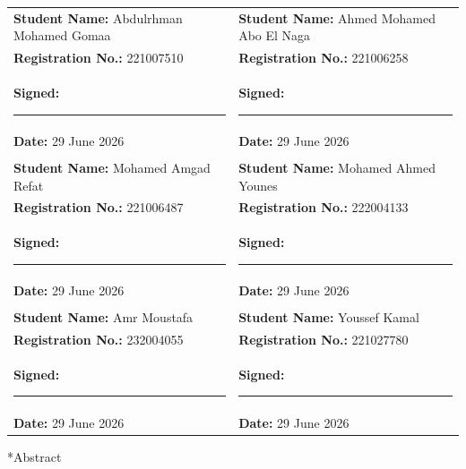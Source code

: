 \documentclass[12pt, a4paper, oneside]{report}
\makeatletter
\newcommand{\chapformat}[1]{%
  \centering
  {\fontsize{14}{17}\selectfont\itshape\addfontfeatures{LetterSpace=3.5}%
    \MakeUppercase{\chaptertitlename}\ \thechapter}\\[24pt]%
  {\fontsize{16}{19}\selectfont\bfseries\addfontfeatures{LetterSpace=0}%
    \MakeUppercase{#1}}%
}
\newcommand{\chapformatstar}[1]{%
  \centering
  {\fontsize{16}{19}\selectfont\bfseries\MakeUppercase{#1}}%
}
\newcommand{\chapterstar}[1]{%
  \clearpage
  \phantomsection
  \edef\@saved@chapcount{\the\value{chapter}}%
  \titleformat{\chapter}[block]{}{}%
    {0pt}{\chapformatstar}%
  \@originalchapter*{#1}%
  \setcounter{chapter}{\@saved@chapcount}%
  \titleformat{\chapter}[block]{}{}%
    {0pt}{\chapformat}%
}
\let\@originalchapter\chapter
\renewcommand{\chapter}{%
  \@ifstar{\chapterstar}{\@originalchapter}%
}
\newcommand{\sigline}{\rule{5cm}{0.4pt}}
\makeatother
\begin{document}
\noindent
\begin{tabular}{@{}p{} p{}@{}}

\textbf{Student Name:} Abdulrhman Mohamed Gomaa
& \textbf{Student Name:} Ahmed Mohamed Abo El Naga \\[6pt]

\textbf{Registration No.:} 221007510
& \textbf{Registration No.:} 221006258 \\[10pt]

\textbf{Signed:} \sigline
& \textbf{Signed:} \sigline \\[10pt]

\textbf{Date:} 29 June 2026
& \textbf{Date:} 29 June 2026 \\[30pt]

\\[20pt]

\textbf{Student Name:} Mohamed Amgad Refat
& \textbf{Student Name:} Mohamed Ahmed Younes \\[6pt]

\textbf{Registration No.:} 221006487
& \textbf{Registration No.:} 222004133 \\[10pt]

\textbf{Signed:} \sigline
& \textbf{Signed:} \sigline \\[10pt]

\textbf{Date:} 29 June 2026
& \textbf{Date:} 29 June 2026 \\[30pt]

\\[20pt]

\textbf{Student Name:} Amr Moustafa
& \textbf{Student Name:} Youssef Kamal \\[6pt]

\textbf{Registration No.:} 232004055
& \textbf{Registration No.:} 221027780 \\[10pt]

\textbf{Signed:} \sigline
& \textbf{Signed:} \sigline \\[10pt]

\textbf{Date:} 29 June 2026
& \textbf{Date:} 29 June 2026 \\

\end{tabular}

\clearpage

\chapter*{Abstract}
\end{document}
